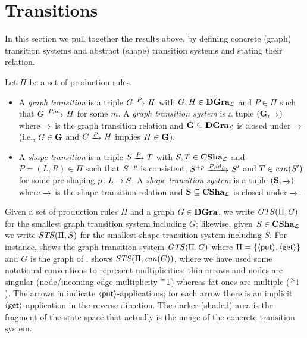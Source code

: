 \section{Transitions}

In this section we pull together the results above, by defining
concrete (graph) transition systems and abstract (shape) transition systems and
stating their relation.

\begin{definition}
Let $\Pi$ be a set of production rules. 
\begin{itemize}\smalltopsep\noitemsep
\item A \emph{graph transition} is a triple $G\trans P H$ with $G,H\in
  \DetGraph_\L$ and $P\in \Pi$ such that $G\trans{P,m} H$ for some $m$. A
  \emph{graph transition system} is a tuple $(\bG,{\trans~})$ where $\trans~$
  is the graph transition relation and $\bG\subseteq \DetGraph_\L$ is closed
  under $\trans~$ (i.e., $G\in \bG$ and $G\trans P H$ implies $H\in \bG$).
\item A \emph{shape transition} is a triple $S\trans P T$ with $S,T\in
  \Canon_\L$ and $P=(L,R)\in \Pi$ such that $\mat p S$ is consistent, $\mat p
  S\trans{P,\id_L} S'$ and $T\in \GCanon(S')$ for some pre-shaping $p\ftype L
  S$. A \emph{shape transition system} is a tuple $(\bS,{\trans~})$ where
  $\trans~$ is the shape transition relation and $\bS\subseteq \Canon_\L$ is
  closed under $\trans~$.%
\end{itemize}
\end{definition}
%
Given a set of production rules $\Pi$ and a graph $G\in \DetGraph$, we write
$\GTS(\Pi,G)$ for the smallest graph transition system including $G$; likewise,
given $S\in \Canon_\L$ we write $\STS(\Pi,S)$ for the smallest shape transition
system including $S$. For instance,  shows the graph transition
system $\GTS(\Pi,G)$ where $\Pi=\set{\Rput,\Rget}$ and $G$ is the graph of
.  shows $\STS(\Pi,\GCanon(G))$, where we
have used some notational conventions to represent multiplicities: thin arrows
and nodes are singular (node/incoming edge multiplicity $\meq1$) whereas fat
ones are multiple ($\mgt1$). The arrows in 
indicate $\Rput$-applications; for each arrow there is an implicit
$\Rget$-application in the reverse direction. The darker (shaded) area is the
fragment of the state space that actually is the image of the concrete
transition system.


